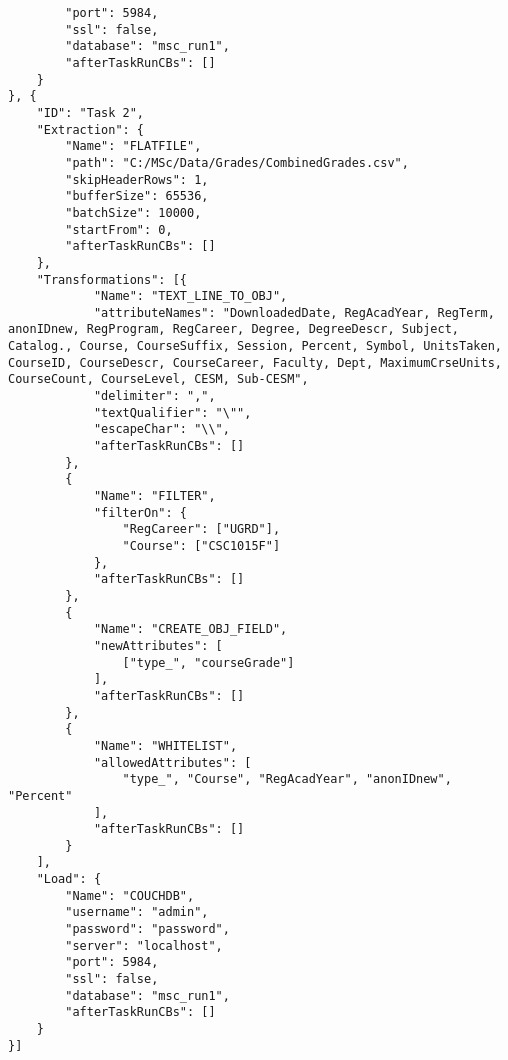 \begin{verbatim}
        "port": 5984,
        "ssl": false,
        "database": "msc_run1",
        "afterTaskRunCBs": []
    }
}, {
    "ID": "Task 2",
    "Extraction": {
        "Name": "FLATFILE",
        "path": "C:/MSc/Data/Grades/CombinedGrades.csv",
        "skipHeaderRows": 1,
        "bufferSize": 65536,
        "batchSize": 10000,
        "startFrom": 0,
        "afterTaskRunCBs": []
    },
    "Transformations": [{
            "Name": "TEXT_LINE_TO_OBJ",
            "attributeNames": "DownloadedDate, RegAcadYear, RegTerm, anonIDnew, RegProgram, RegCareer, Degree, DegreeDescr, Subject, Catalog., Course, CourseSuffix, Session, Percent, Symbol, UnitsTaken, CourseID, CourseDescr, CourseCareer, Faculty, Dept, MaximumCrseUnits, CourseCount, CourseLevel, CESM, Sub-CESM",
            "delimiter": ",",
            "textQualifier": "\"",
            "escapeChar": "\\",
            "afterTaskRunCBs": []
        },
        {
            "Name": "FILTER",
            "filterOn": {
                "RegCareer": ["UGRD"],
                "Course": ["CSC1015F"]
            },
            "afterTaskRunCBs": []
        },
        {
            "Name": "CREATE_OBJ_FIELD",
            "newAttributes": [
                ["type_", "courseGrade"]
            ],
            "afterTaskRunCBs": []
        },
        {
            "Name": "WHITELIST",
            "allowedAttributes": [
                "type_", "Course", "RegAcadYear", "anonIDnew", "Percent"
            ],
            "afterTaskRunCBs": []
        }
    ],
    "Load": {
        "Name": "COUCHDB",
        "username": "admin",
        "password": "password",
        "server": "localhost",
        "port": 5984,
        "ssl": false,
        "database": "msc_run1",
        "afterTaskRunCBs": []
    }
}]
\end{verbatim}

